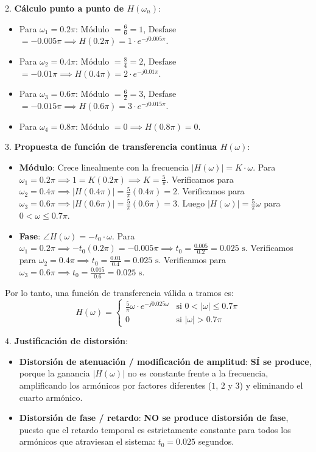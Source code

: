 \begin{resolucion}
2. \textbf{Cálculo punto a punto de $H(\omega_n)$}:
   \begin{itemize}
       \item Para $\omega_1 = 0.2\pi$: Módulo $= \frac{6}{6} = 1$, Desfase $= -0.005\pi \implies H(0.2\pi) = 1 \cdot e^{-j0.005\pi}$.
       \item Para $\omega_2 = 0.4\pi$: Módulo $= \frac{8}{4} = 2$, Desfase $= -0.01\pi \implies H(0.4\pi) = 2 \cdot e^{-j0.01\pi}$.
       \item Para $\omega_3 = 0.6\pi$: Módulo $= \frac{6}{2} = 3$, Desfase $= -0.015\pi \implies H(0.6\pi) = 3 \cdot e^{-j0.015\pi}$.
       \item Para $\omega_4 = 0.8\pi$: Módulo $= 0 \implies H(0.8\pi) = 0$.
   \end{itemize}

3. \textbf{Propuesta de función de transferencia continua $H(\omega)$}:
   \begin{itemize}
       \item \textbf{Módulo}: Crece linealmente con la frecuencia $|H(\omega)| = K \cdot \omega$.
         Para $\omega_1 = 0.2\pi \implies 1 = K (0.2\pi) \implies K = \frac{5}{\pi}$.
         Verificamos para $\omega_2 = 0.4\pi \implies |H(0.4\pi)| = \frac{5}{\pi} (0.4\pi) = 2$.
         Verificamos para $\omega_3 = 0.6\pi \implies |H(0.6\pi)| = \frac{5}{\pi} (0.6\pi) = 3$.
         Luego $|H(\omega)| = \frac{5}{\pi} \omega$ para $0 < \omega \le 0.7\pi$.
       \item \textbf{Fase}: $\angle H(\omega) = -t_0 \cdot \omega$.
         Para $\omega_1 = 0.2\pi \implies -t_0 (0.2\pi) = -0.005\pi \implies t_0 = \frac{0.005}{0.2} = 0.025 \text{ s}$.
         Verificamos para $\omega_2 = 0.4\pi \implies t_0 = \frac{0.01}{0.4} = 0.025 \text{ s}$.
         Verificamos para $\omega_3 = 0.6\pi \implies t_0 = \frac{0.015}{0.6} = 0.025 \text{ s}$.
   \end{itemize}
   Por lo tanto, una función de transferencia válida a tramos es:
   \[
   H(\omega) = \begin{cases} \frac{5}{\pi} \omega \cdot e^{-j 0.025 \omega} & \text{si } 0 < |\omega| \le 0.7\pi \\ 0 & \text{si } |\omega| > 0.7\pi \end{cases}
   \]

4. \textbf{Justificación de distorsión}:
   \begin{itemize}
       \item \textbf{Distorsión de atenuación / modificación de amplitud}: \textbf{SÍ se produce}, porque la ganancia $|H(\omega)|$ no es constante frente a la frecuencia, amplificando los armónicos por factores diferentes ($1$, $2$ y $3$) y eliminando el cuarto armónico.
       \item \textbf{Distorsión de fase / retardo}: \textbf{NO se produce distorsión de fase}, puesto que el retardo temporal es estrictamente constante para todos los armónicos que atraviesan el sistema: $t_0 = 0.025$ segundos.
   \end{itemize}


\end{resolucion}
